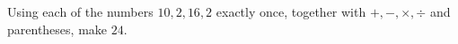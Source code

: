Using each of the numbers $10,2,16,2$ exactly once, together with $+,-,\times,\div$ and parentheses, make $24$.
